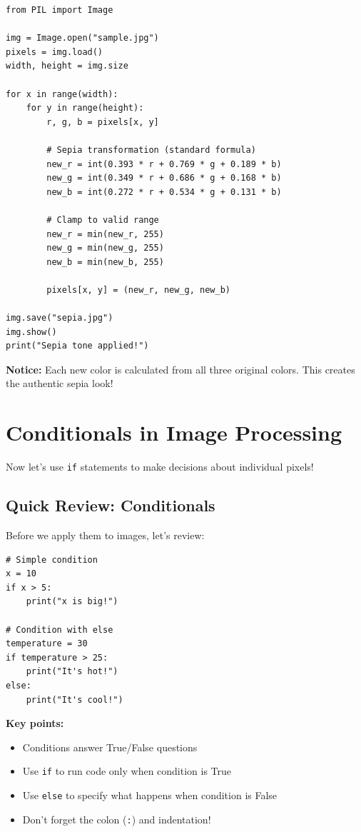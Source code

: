 \documentclass[11pt]{article}
\begin{document}
\begin{lstlisting}
from PIL import Image

img = Image.open("sample.jpg")
pixels = img.load()
width, height = img.size

for x in range(width):
    for y in range(height):
        r, g, b = pixels[x, y]

        # Sepia transformation (standard formula)
        new_r = int(0.393 * r + 0.769 * g + 0.189 * b)
        new_g = int(0.349 * r + 0.686 * g + 0.168 * b)
        new_b = int(0.272 * r + 0.534 * g + 0.131 * b)

        # Clamp to valid range
        new_r = min(new_r, 255)
        new_g = min(new_g, 255)
        new_b = min(new_b, 255)

        pixels[x, y] = (new_r, new_g, new_b)

img.save("sepia.jpg")
img.show()
print("Sepia tone applied!")
\end{lstlisting}

\textbf{Notice:} Each new color is calculated from all three original colors. This creates the authentic sepia look!

\section{Conditionals in Image Processing}

Now let's use \texttt{if} statements to make decisions about individual pixels!

\subsection*{Quick Review: Conditionals}

Before we apply them to images, let's review:

\begin{lstlisting}
# Simple condition
x = 10
if x > 5:
    print("x is big!")

# Condition with else
temperature = 30
if temperature > 25:
    print("It's hot!")
else:
    print("It's cool!")
\end{lstlisting}

\textbf{Key points:}
\begin{itemize}
    \item Conditions answer True/False questions
    \item Use \texttt{if} to run code only when condition is True
    \item Use \texttt{else} to specify what happens when condition is False
    \item Don't forget the colon (\texttt{:}) and indentation!
\end{itemize}
\end{document}
